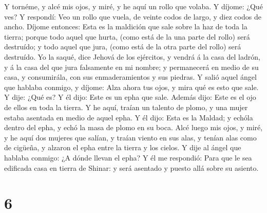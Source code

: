 Y tornéme, y alcé mis ojos, y miré, y he aquí un rollo
que volaba.  Y díjome: ¿Qué ves? Y respondí: Veo un rollo
que vuela, de veinte codos de largo, y diez codos de ancho.
 Díjome entonces: Esta es la maldición que sale sobre la
haz de toda la tierra; porque todo aquel que hurta, (como está de la una
parte del rollo) será destruído; y todo aquel que jura, (como está de la
otra parte del rollo) será destruído.  Yo la saqué, dice
Jehová de los ejércitos, y vendrá á la casa del ladrón, y á la casa del
que jura falsamente en mi nombre; y permanecerá en medio de su casa, y
consumirála, con sus enmaderamientos y sus piedras.  Y
salió aquel ángel que hablaba conmigo, y díjome: Alza ahora tus ojos, y
mira qué es esto que sale.  Y dije: ¿Qué es? Y él dijo:
Este es un epha que sale. Además dijo: Este es el ojo de ellos en toda
la tierra.  Y he aquí, traían un talento de plomo, y una
mujer estaba asentada en medio de aquel epha.  Y él dijo:
Esta es la Maldad; y echóla dentro del epha, y echó la masa de plomo en
su boca.  Alcé luego mis ojos, y miré, y he aquí dos
mujeres que salían, y traían viento en sus alas, y tenían alas como de
cigüeña, y alzaron el epha entre la tierra y los cielos. 
Y dije al ángel que hablaba conmigo: ¿A dónde llevan el epha?
 Y él me respondió: Para que le sea edificada casa en
tierra de Shinar: y será asentado y puesto allá sobre su asiento.

\hypertarget{section-5}{%
\section{6}\label{section-5}}


